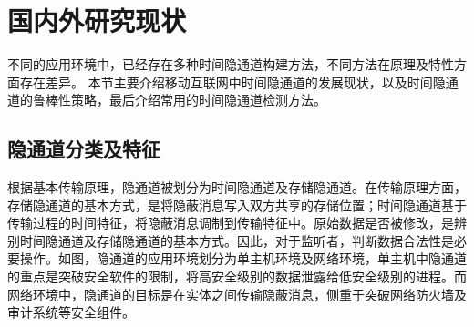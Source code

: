 \section{国内外研究现状}
\label{sec:intro:background}

不同的应用环境中，已经存在多种时间隐通道构建方法，不同方法在原理及特性方面存在差异。
本节主要介绍移动互联网中时间隐通道的发展现状，以及时间隐通道的鲁棒性策略，最后介绍常用的时间隐通道检测方法。

\subsection{隐通道分类及特征}
\label{sec:intro:background:covert-channel}

根据基本传输原理，隐通道被划分为时间隐通道及存储隐通道。在传输原理方面，存储隐通道的基本方式，是将隐蔽消息写入双方共享的存储位置；时间隐通道基于传输过程的时间特征，将隐蔽消息调制到传输特征中。原始数据是否被修改，是辨别时间隐通道及存储隐通道的基本方式。因此，对于监听者，判断数据合法性是必要操作。如图，隐通道的应用环境划分为单主机环境及网络环境，单主机中隐通道的重点是突破安全软件的限制，将高安全级别的数据泄露给低安全级别的进程。而网络环境中，隐通道的目标是在实体之间传输隐蔽消息，侧重于突破网络防火墙及审计系统等安全组件。

